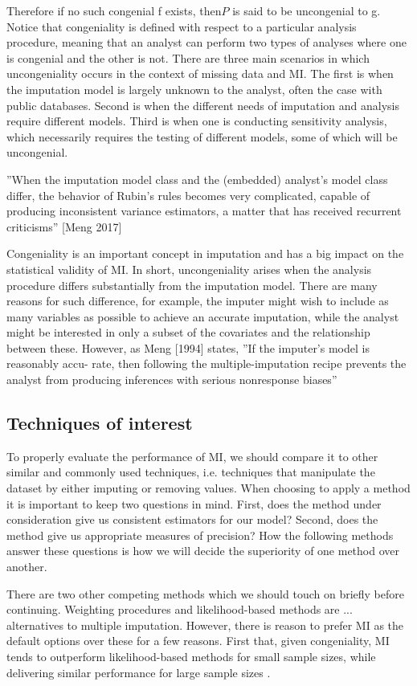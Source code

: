 \documentclass{article}
\begin{document}
	Therefore if no such congenial f exists, then$P$ is said to be uncongenial to g. Notice that congeniality is defined with respect to a particular analysis procedure, meaning that an analyst can perform two types of analyses where one is congenial and the other is not. There are three main scenarios in which uncongeniality occurs in the context of missing data and MI. The first is when the imputation model is largely unknown to the analyst, often the case with public databases. Second is when the different needs of imputation and analysis require different models. Third is when one is conducting sensitivity analysis, which necessarily requires the testing of different models, some of which will be uncongenial.
	
	
	''When the imputation model class and the (embedded) analyst’s model class
	differ, the behavior of Rubin’s rules becomes very complicated, capable of producing inconsistent variance estimators, a matter that has received recurrent
	criticisms'' [Meng 2017]
	
	Congeniality is an important concept in imputation and has a big impact on the statistical validity of MI. In short, uncongeniality arises when the analysis procedure differs substantially from the imputation model. There are many reasons for such difference, for example, the imputer might wish to include as many variables as possible to achieve an accurate imputation, while the analyst might be interested in only a subset of the covariates and the relationship between these. However, as Meng [1994] states, ''If the imputer's model is reasonably accu-
	rate, then following the multiple-imputation recipe
	prevents the analyst from producing inferences with
	serious nonresponse biases''
	
	\subsection{Techniques of interest}
	To properly evaluate the performance of MI, we should compare it to other similar and commonly used techniques, i.e. techniques that manipulate the dataset by either imputing or removing values. When choosing to apply a method it is important to keep two questions in mind. First, does the method under consideration give us consistent estimators for our model? Second, does the method give us appropriate measures of precision? How the following methods answer these questions is how we will decide the superiority of one method over another.
	
	There are two other competing methods which we should touch on briefly before continuing. Weighting procedures and likelihood-based methods are ... alternatives to multiple imputation. However, there is reason to prefer MI as the default options over these for a few reasons. First that, given congeniality, MI tends to outperform likelihood-based methods for small sample sizes, while delivering similar performance for large sample sizes \cite{schafer_multiple_2016}.
	
\end{document}
